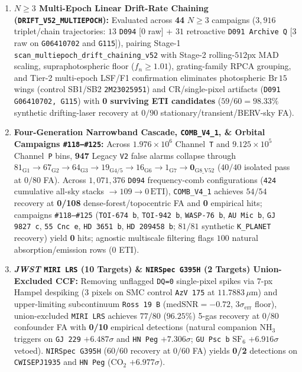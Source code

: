 \documentclass[twocolumn,10pt]{article}
\begin{document}
\begin{enumerate}
  \item \textbf{$N\ge 3$ Multi-Epoch Linear Drift-Rate Chaining (\texttt{DRIFT\_V52\_MULTIEPOCH}):} Evaluated across \textbf{44} $N\ge 3$ campaigns ($3{,}916$ triplet/chain trajectories: $13$ \texttt{D094} [$0$ raw] + $31$ retroactive \texttt{D091 Archive Q} [$3$ raw on \texttt{G06410702} and \texttt{G115}]), pairing Stage-1 \texttt{scan\_multiepoch\_drift\_chaining\_v52} with Stage-2 rolling-$512$px MAD scaling, supraphotospheric floor ($f_n \ge 1.01$), grating-family RPCA grouping, and Tier-2 multi-epoch LSF/F1 confirmation eliminates photospheric $\mathrm{Br}\,15$ wings (control SB1/SB2 \texttt{2M23025951}) and CR/single-pixel artifacts (\texttt{D091 G06410702, G115}) with \textbf{0 surviving ETI candidates} ($59/60 = 98.33\%$ synthetic drifting-laser recovery at $0/90$ stationary/transient/BERV-sky FA).
  \item \textbf{Four-Generation Narrowband Cascade, \texttt{COMB\_V4\_1}, \& Orbital Campaigns \texttt{\#118--\#125}:} Across $1.976\times 10^6$ Channel~\texttt{T} and $9.125\times 10^5$ Channel~\texttt{P} bins, \textbf{947} Legacy \texttt{V2} false alarms collapse through $81_{\mathrm{G1}} \rightarrow 67_{\mathrm{G2}} \rightarrow 64_{\mathrm{G3}} \rightarrow 19_{\mathrm{G4/5}} \rightarrow 16_{\mathrm{G6}} \rightarrow 1_{\mathrm{G7}} \rightarrow \mathbf{0}_{\mathrm{G8\_V52}}$ ($40/40$ isolated pass at $0/80$ FA). Across $1{,}071{,}376$ \texttt{D094} frequency-comb configurations (\texttt{424} cumulative all-sky stacks $\rightarrow 109 \rightarrow 0\,\mathrm{ETI}$), \texttt{COMB\_V4\_1} achieves $54/54$ recovery at \textbf{0/108} dense-forest/topocentric FA and \textbf{0} empirical hits; campaigns \texttt{\#118--\#125} (\texttt{TOI-674\,b}, \texttt{TOI-942\,b}, \texttt{WASP-76\,b}, \texttt{AU\,Mic\,b}, \texttt{GJ\,9827\,c}, \texttt{55\,Cnc\,e}, \texttt{HD\,3651\,b}, \texttt{HD\,209458\,b}; $81/81$ synthetic \texttt{K\_PLANET} recovery) yield \textbf{0} hits; agnostic multiscale filtering flags $100$ natural absorption/emission rows ($0$ ETI).
  \item \textbf{\textit{JWST} \texttt{MIRI LRS} (10 Targets) \& \texttt{NIRSpec G395H} (2 Targets) Union-Excluded CCF:} Removing unflagged \texttt{DQ=0} single-pixel spikes via $7$-px Hampel despiking (3 pixels on SMC control \texttt{AzV\,175} at $11.7883\,\mu\text{m}$) and upper-limiting subcontinuum \texttt{Ross\,19\,B} ($\mathrm{medSNR}=-0.72$, $3\sigma_{\mathrm{err}}$ floor), union-excluded \texttt{MIRI LRS} achieves $77/80$ ($96.25\%$) 5-gas recovery at $0/80$ confounder FA with \textbf{0/10} empirical detections (natural companion $\mathrm{NH_3}$ triggers on \texttt{GJ\,229} $+6.487\sigma$ and \texttt{HN\,Peg} $+7.306\sigma$; \texttt{GU\,Psc\,b} $\mathrm{SF_6}$ $+6.916\sigma$ vetoed). \texttt{NIRSpec G395H} ($60/60$ recovery at $0/60$ FA) yields \textbf{0/2} detections on \texttt{CWISEPJ1935} and \texttt{HN\,Peg} ($\mathrm{CO_2}$ $+6.977\sigma$).

\end{enumerate}
\end{document}
